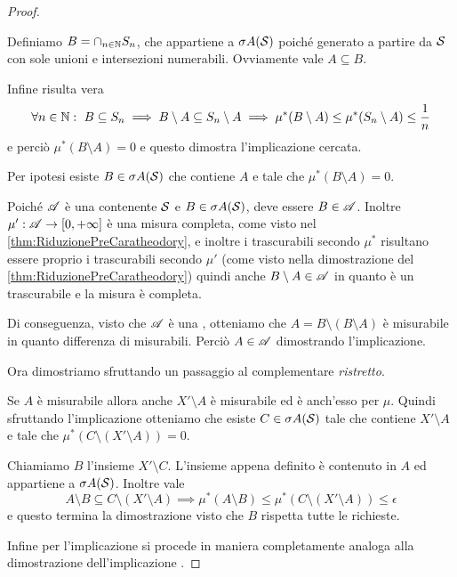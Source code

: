 \begin{proof}
\begin{description}
		Definiamo $B=\cap_{n\in\N}S_n$, che appartiene a $\sigma A(\S)$ poiché generato a partire da $\S$ con sole unioni e intersezioni numerabili. Ovviamente vale $A\subseteq B$.
		
		Infine risulta vera 
		\begin{equation*}
			\forall n\in\N:\ B\subseteq S_n\implies B\setminus A\subseteq S_n\setminus A\implies \mu^*(B\setminus A)\le \mu^*(S_n\setminus A)\le \frac1n
		\end{equation*}
		e perciò $\mu^*(B\setminus A)=0$ e questo dimostra l'implicazione cercata.
		\item[\ImplicationProof{it:SigmaDaFuoriEquivalenze}{it:MisurabileEquivalenze}] Per ipotesi esiste $B\in\sigma A(\S)$ che contiene $A$ e tale che $\mu^*(B\setminus A)=0$.
		
		Poiché $\A$ è una \sigalg{} contenente $\S$ e $B\in\sigma A(\S)$, deve essere $B\in\A$. 
		Inoltre $\mu':\A\to\Rpiu$ è una misura completa, come visto nel \cref{thm:RiduzionePreCaratheodory}, e inoltre i trascurabili secondo $\mu^*$ risultano essere proprio i trascurabili secondo $\mu'$ (come visto nella dimostrazione del \cref{thm:RiduzionePreCaratheodory}) quindi anche $B\setminus A\in \A$ in quanto è un trascurabile e la misura è completa. 
		
		Di conseguenza, visto che $\A$ è una \sigalg, otteniamo che $A=B\setminus (B\setminus A)$ è misurabile in quanto differenza di misurabili. Perciò $A\in\A$ dimostrando l'implicazione.
	\end{description}
	
	Ora dimostriamo  sfruttando un passaggio al complementare \emph{ristretto}.
	
	Se $A$ è misurabile allora anche $X'\setminus A$ è misurabile ed è anch'esso \sigfin[o] per $\mu$. Quindi sfruttando l'implicazione  otteniamo che esiste $C\in\sigma A(\S)$ tale che contiene $X'\setminus A$ e tale che $\mu^*(C\setminus(X'\setminus A))=0$. 
	
	Chiamiamo $B$ l'insieme $X'\setminus C$. L'insieme appena definito è contenuto in $A$ ed appartiene a $\sigma A(\S)$. Inoltre vale
	\begin{equation*}
		A\setminus B\subseteq C\setminus (X'\setminus A) \implies \mu^*(A\setminus B)\le \mu^*\left(C\setminus(X'\setminus A)\right)\le \epsilon
	\end{equation*}
	e questo termina la dimostrazione visto che $B$ rispetta tutte le richieste.
	
	Infine per l'implicazione  si procede in maniera completamente analoga alla dimostrazione dell'implicazione .
\end{proof}

